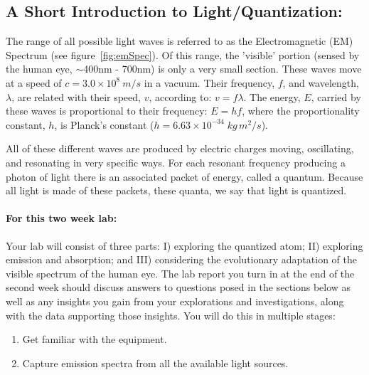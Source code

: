 \subsection*{A Short Introduction to Light/Quantization:}
The range of all possible light waves is referred to as the Electromagnetic (EM) Spectrum (see figure~\ref{fig:emSpec}). 
Of this range, the 'visible' portion (sensed by the human eye, $\sim$400nm - 700nm) is only a very small section. 
These waves move at a speed of $c = 3.0 \times 10^{8} \: m/s$ in a vacuum. 
Their frequency, $f$, and wavelength, $\lambda$, are related with their speed, $v$, according to: $v = f \lambda$. 
The energy, $E$, carried by these waves is proportional to their frequency: $E = h f$, where the proportionality constant, $h$, is Planck's constant ($h = 6.63 \times 10^{-34} \; kg \, m^{2}/s$). 
\par
All of these different waves are produced by electric charges moving, oscillating, and resonating in very specific ways. 
For each resonant frequency producing a photon of light there is an associated packet of energy, called a quantum. 
Because all light is made of these packets, these quanta, we say that light is quantized.

\paragraph{For this two week lab:} Your lab will consist of three parts: I) exploring the quantized atom; II) exploring emission and absorption; and III) considering the evolutionary adaptation of the visible spectrum of the human eye. 
The lab report you turn in at the end of the second week should discuss answers to questions posed in the sections below as well as any insights you gain from your explorations and investigations, along with the data supporting those insights.
You will do this in multiple stages:
\begin{enumerate}
\itemsep-0.2em
\item Get familiar with the equipment.
\item Capture emission spectra from all the available light sources.
\end{enumerate}

\newpage

